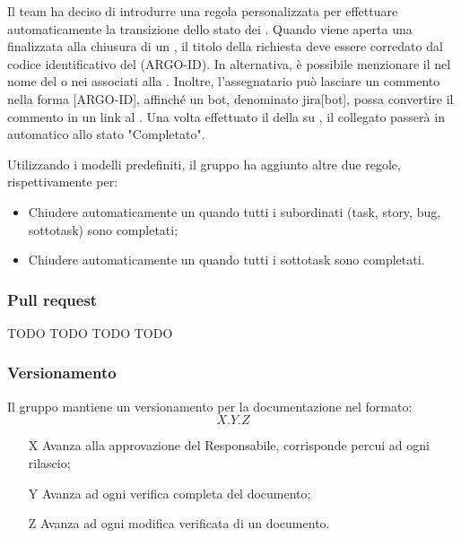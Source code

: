 \vspace{0.5\baselineskip}
\par Il team ha deciso di introdurre una regola personalizzata per effettuare automaticamente la transizione dello stato dei . Quando viene aperta una  finalizzata alla chiusura di un , il titolo della richiesta deve essere corredato dal codice identificativo del  (ARGO-ID). In alternativa, è possibile menzionare il  nel nome del  o nei  associati alla . Inoltre, l’assegnatario può lasciare un commento nella forma [ARGO-ID], affinché un bot, denominato jira[bot], possa convertire il commento in un link al  . Una volta effettuato il  della  su , il  collegato passerà in automatico allo stato "Completato".
\par Utilizzando i modelli predefiniti, il gruppo ha aggiunto altre due regole, rispettivamente per:
\begin{itemize}
  \item Chiudere automaticamente un  quando tutti i  subordinati (task, story, bug, sottotask) sono completati;
  \item Chiudere automaticamente un  quando tutti i sottotask sono completati.
\end{itemize}

\subsubsection{Pull request}
TODO
TODO
TODO
TODO


\subsubsection{Versionamento}
Il gruppo mantiene un versionamento per la documentazione nel formato:
\[ X.Y.Z \]
\begin{itemize}
  \item[X] Avanza alla approvazione del Responsabile, corrisponde percui ad ogni rilascio;
  \item[Y] Avanza ad ogni verifica completa del documento;
  \item[Z] Avanza ad ogni modifica verificata di un documento.
\end{itemize}

